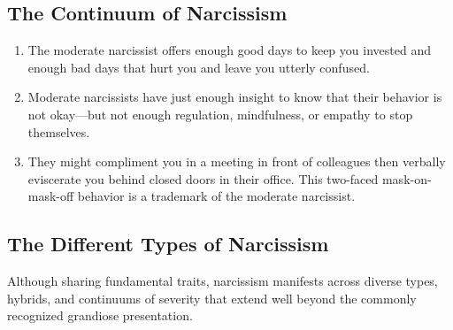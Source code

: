 \documentclass[11pt,letter]{article}
\begin{document}
\subsection{The Continuum of Narcissism}

\begin{enumerate}

\item The moderate narcissist offers enough good days to keep you invested and
enough bad days that hurt you and leave you utterly confused.

\item Moderate narcissists have just enough insight to know that their behavior is
not okay—but not enough regulation, mindfulness, or empathy to stop themselves.

\item They might compliment you in a meeting in front of colleagues then verbally
eviscerate you behind closed doors in their office. This two-faced
mask-on-mask-off behavior is a trademark of the moderate narcissist.

\end{enumerate}

\subsection{The Different Types of Narcissism}

Although sharing fundamental traits, narcissism manifests across diverse types,
hybrids, and continuums of severity that extend well beyond the commonly
recognized grandiose presentation.
\end{document}
